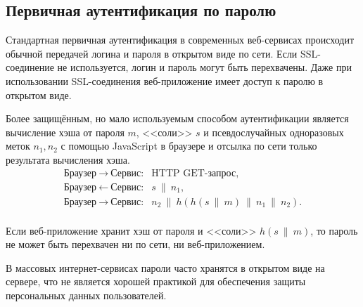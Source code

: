 \subsection{Первичная аутентификация по паролю}

Стандартная первичная аутентификация в современных веб-сервисах происходит обычной передачей логина и пароля в открытом виде по сети. Если SSL-соединение не используется, логин и пароль могут быть перехвачены. Даже при использовании SSL-соединения веб-приложение имеет доступ к паролю в открытом виде.

Более защищённым, но мало используемым способом аутентификации является вычисление хэша от пароля $m$, <<соли>> $s$ и псевдослучайных одноразовых меток $n_1, n_2$ с помощью JavaScript в браузере и отсылка по сети только результата вычисления хэша.
\[ \begin{array}{ll}
    \text{Браузер} ~\rightarrow~ \text{Сервис:} & \text{HTTP GET-запрос,} \\
    \text{Браузер} ~\leftarrow~ \text{Сервис:}  & s ~\|~ n_1, \\
    \text{Браузер} ~\rightarrow~ \text{Сервис:} & n_2 ~\|~ h( h(s ~\|~ m) ~\|~ n_1 ~\|~ n_2). \\
\end{array} \]

Если веб-приложение хранит хэш от пароля и <<соли>> $h(s ~\|~ m)$, то пароль не может быть перехвачен ни по сети, ни веб-приложением.

В массовых интернет-сервисах пароли часто хранятся в открытом виде на сервере, что не является хорошей практикой для обеспечения защиты персональных данных пользователей.




